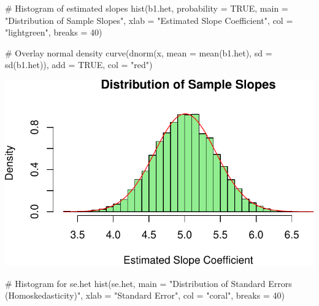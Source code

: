 \documentclass[
  11pt,
]{article}
\newenvironment{Shaded}{\begin{snugshade}}{\end{snugshade}}
\newcommand{\AttributeTok}[1]{\textcolor[rgb]{0.40,0.45,0.13}{#1}}
\newcommand{\CommentTok}[1]{\textcolor[rgb]{0.37,0.37,0.37}{#1}}
\newcommand{\ConstantTok}[1]{\textcolor[rgb]{0.56,0.35,0.01}{#1}}
\newcommand{\DecValTok}[1]{\textcolor[rgb]{0.68,0.00,0.00}{#1}}
\newcommand{\FunctionTok}[1]{\textcolor[rgb]{0.28,0.35,0.67}{#1}}
\newcommand{\NormalTok}[1]{\textcolor[rgb]{0.00,0.23,0.31}{#1}}
\newcommand{\StringTok}[1]{\textcolor[rgb]{0.13,0.47,0.30}{#1}}
\begin{document}
\begin{Shaded}
\begin{Highlighting}[]
\CommentTok{\# Histogram of estimated slopes}
\FunctionTok{hist}\NormalTok{(b1.het, }\AttributeTok{probability =} \ConstantTok{TRUE}\NormalTok{, }
     \AttributeTok{main =} \StringTok{"Distribution of Sample Slopes"}\NormalTok{, }
     \AttributeTok{xlab =} \StringTok{"Estimated Slope Coefficient"}\NormalTok{, }\AttributeTok{col =} \StringTok{"lightgreen"}\NormalTok{, }\AttributeTok{breaks =} \DecValTok{40}\NormalTok{)}

\CommentTok{\# Overlay normal density}
\FunctionTok{curve}\NormalTok{(}\FunctionTok{dnorm}\NormalTok{(x, }\AttributeTok{mean =} \FunctionTok{mean}\NormalTok{(b1.het), }\AttributeTok{sd =} \FunctionTok{sd}\NormalTok{(b1.het)), }\AttributeTok{add =} \ConstantTok{TRUE}\NormalTok{, }\AttributeTok{col =} \StringTok{"red"}\NormalTok{)}
\end{Highlighting}
\end{Shaded}

\includegraphics{HW-4-CODE-and-ANSWERS_files/figure-pdf/unnamed-chunk-17-3.pdf}

\begin{Shaded}
\begin{Highlighting}[]
\CommentTok{\# Histogram for se.het}
\FunctionTok{hist}\NormalTok{(se.het, }
     \AttributeTok{main =} \StringTok{"Distribution of Standard Errors (Homoskedasticity)"}\NormalTok{, }
     \AttributeTok{xlab =} \StringTok{"Standard Error"}\NormalTok{, }\AttributeTok{col =} \StringTok{"coral"}\NormalTok{, }\AttributeTok{breaks =} \DecValTok{40}\NormalTok{)}
\end{Highlighting}
\end{Shaded}
\end{document}
